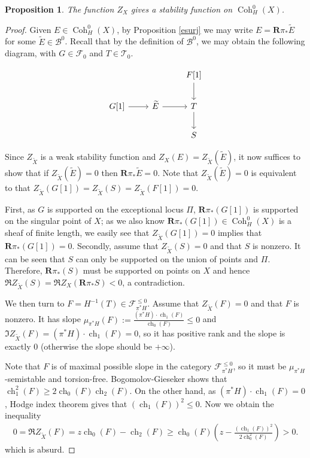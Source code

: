\documentclass[12pt]{amsart}
\newtheorem{proposition}[theorem]{Proposition}
\theoremstyle{definition}
\DeclareMathOperator{\Coh}{Coh}
\DeclareMathOperator{\ch}{ch}
\begin{document}
\begin{proposition}
The function $Z_X$ gives a stability function on $\Coh^0_H(X)$.
\end{proposition}
\begin{proof}
Given $E \in \Coh^0_H(X)$,  by Proposition \ref{esurj} we may write $E =\mathbf{R} \pi_\ast \widetilde{E}$ for some $\widetilde{E} \in \mathcal{B}^0$.
Recall that by the definition of $\mathcal{B}^0$,
we may obtain the following diagram,
with $G \in \mathcal{F}_0$ and $T \in \mathcal{T}_0$.

\[
\begin{tikzcd}
                 &             & {F[1]} \arrow[d] \\
{G[1]} \arrow[r] & \widetilde{E} \arrow[r] & T \arrow[d]              \\
                 &             & S             
\end{tikzcd}
\]

Since $Z_{\widetilde{X}}$ is a weak stability function and $Z_X(E)=Z_{\widetilde{X}}(\widetilde{E})$,
it now suffices to show that if $Z_{\widetilde{X}}(\widetilde{E})=0$ then $\mathbf{R}\pi_\ast \widetilde{E}=0$.
Note that $Z_{\widetilde{X}}(\widetilde{E})=0$ is equivalent to that 
$Z_{\widetilde{X}}(G[1])=Z_{\widetilde{X}}(S)=Z_{\widetilde{X}}(F[1])=0$.

First, as $G$ is supported on the exceptional locus $\Pi$,
$\mathbf{R}\pi_\ast (G[1])$ is supported on the singular point of $X$;
as we also know $\mathbf{R}\pi_\ast (G[1]) \in \Coh^0_H(X)$ is a sheaf of finite length, 
we easily see that $Z_{\widetilde{X}}(G[1])=0$ implies that $\mathbf{R}\pi_\ast (G[1])=0$.
Secondly, assume that $Z_{\widetilde{X}}(S) = 0$ and that $S$ is nonzero.
It can be seen that $S$ can only be supported on the union of points and $\Pi$.
Therefore, $\mathbf{R}\pi_\ast (S)$ must be supported on points on $X$ and hence $\Re Z_{\widetilde{X}}(S)= \Re Z_X(\mathbf{R}\pi_\ast S)<0$,
a contradiction.


We then turn to $F=H^{-1}(T) \in \mathcal{F}^{\leq 0}_{\pi^\ast H}$.
Assume that $Z_{\widetilde{X}}(F) = 0$ and that $F$ is nonzero.
It has slope $\mu_{\pi^\ast H }(F) :=  \frac{(\pi^\ast H)  \cdot \ch_1(F)}{ \ch_0(F)} \leq 0$ and $\Im Z_{\widetilde{X}}(F) = (\pi^\ast H)  \cdot \ch_1(F) =0$,
so it has positive rank and the slope is exactly $0$ (otherwise the slope should be $+\infty$).

Note that $F$ is of maximal possible slope in the category $\mathcal{F}^{\leq 0}_{\pi^\ast H}$,
so it must be $\mu_{\pi^\ast H}$-semistable and torsion-free.
Bogomolov-Gieseker shows that $\ch^2_1(F) \geq 2\ch_0(F)\ch_2(F)$.
On the other hand, as $(\pi^\ast H) \cdot \ch_1(F) = 0$, Hodge index theorem gives that $(\ch_1(F))^2 \leq 0$.
Now we obtain the inequality
\begin{equation*}
\begin{split}
0 = \Re Z_{\widetilde{X}}(F) = z \ch_0 (F) - \ch_2(F) \geq \ch_0 (F) ( z - \frac{(\ch_1(F))^2}{ 2 \ch^2_0(F)} ) > 0.
\end{split}
\end{equation*}
which is absurd.



\end{proof}
\end{document}

